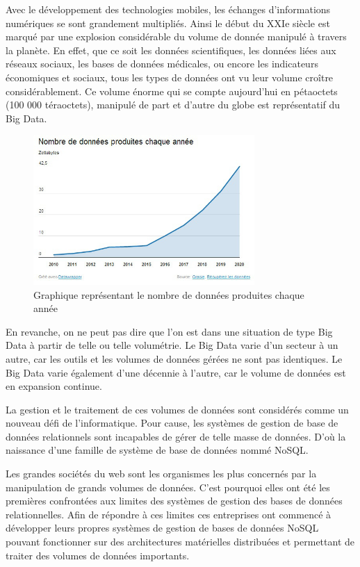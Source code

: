 \documentclass[12pt]{article}
\begin{document}
\par
Avec le développement des technologies mobiles, les échanges d’informations numériques se sont grandement multipliés. Ainsi le début du XXIe siècle est marqué par une explosion considérable du volume de donnée manipulé à travers la planète. En effet, que ce soit les données scientifiques, les données liées aux réseaux sociaux, les bases de données médicales, ou encore les indicateurs économiques et sociaux, tous les types de données ont vu leur volume croître considérablement. Ce volume énorme qui se compte aujourd’hui en pétaoctets (100 000 téraoctets), manipulé de part et d’autre du globe est représentatif du Big Data. 
\begin{figure}[H]
\centering
\includegraphics[width=0.75\textwidth]{graphe}
\caption{Graphique représentant le nombre de données produites chaque année}
\end{figure}
En revanche, on ne peut pas dire que l’on est dans une situation de type Big Data à partir de telle ou telle volumétrie. Le Big Data varie d’un secteur à un autre, car les outils et les volumes de données gérées ne sont pas identiques. Le Big Data varie également d’une décennie à l’autre, car le volume de données est en expansion continue. 
\par
La gestion et le traitement de ces volumes de données sont considérés comme un nouveau défi de l’informatique. Pour cause, les systèmes de gestion de base de données relationnels sont incapables de gérer de telle masse de données. D’où la naissance d’une famille de système de base de données nommé NoSQL.
\par
Les grandes sociétés du web sont les organismes les plus concernés par la manipulation de grands volumes de données. C’est pourquoi elles ont été les premières confrontées aux limites des systèmes de gestion des bases de données relationnelles. Afin de répondre à ces limites ces entreprises ont commencé à développer leurs propres systèmes de gestion de bases de données NoSQL pouvant fonctionner sur des architectures matérielles distribuées et permettant de traiter des volumes de données importants. 
\end{document}
